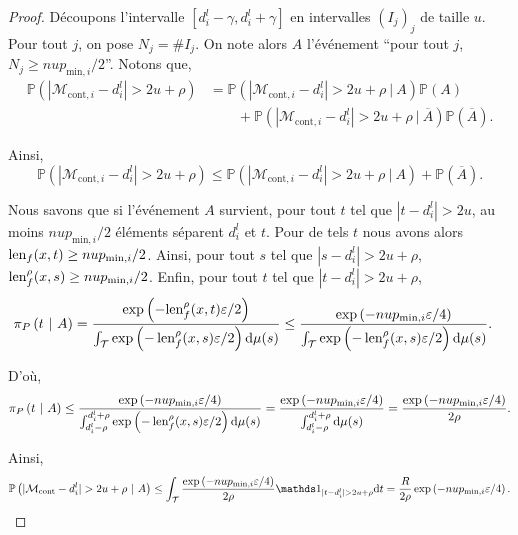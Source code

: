 \begin{proof}
    Découpons l'intervalle \([d_i^l - \gamma, d_i^l + \gamma]\) en intervalles \((I_j)_j\) de taille \(u\). Pour tout \(j\), on pose \(N_j = \#I_j\). On note alors \(A\) l'événement ``pour tout \(j\), \(N_j \geq nup_{\text{min}, i}/2\)''. Notons que,
    \begin{align*}
        \mathbb P\left( |\mathcal  M_{\text{cont}, i} - d_i^l| > 2u + \rho \right) & = \mathbb P\left( |\mathcal M_{\text{cont}, i} - d_i^l| > 2u + \rho \ | \ A \right)\mathbb P\left( A \right)\\
        & \quad \quad  + \mathbb P\left( |\mathcal M_{\text{cont}, i} - d_i^l| > 2u + \rho \ | \ \overline A \right) \mathbb P \left( \overline A  \right).
    \end{align*}

    Ainsi,
    \[
        \mathbb P\left( |\mathcal M_{\text{cont}, i} - d_i^l| > 2u + \rho \right) \leq \mathbb P\left( |\mathcal M_{\text{cont}, i} - d_i^l| > 2u + \rho \ | \ A \right) +  \mathbb P \left( \overline A  \right).
    \]

    Nous savons que si l'événement \(A\) survient, pour tout \(t\) tel que \(|t - d_i^l| > 2u\), au moins \(nup_{\text{min}, i}/2\) éléments séparent \(d_i^l\) et \(t\). Pour de tels \(t\) nous avons alors \(\operatorname{len}_f(x,t) \geq nup_{\text{min}, i}/2\). Ainsi, pour tout \(s\) tel que \(|s - d_i^l| > 2u + \rho\), \(\operatorname{len}_f^\rho(x,s) \geq nup_{\text{min}, i}/2\). Enfin, pour tout \(t\) tel que \(|t - d_i^l| > 2u + \rho\),
    \begin{align*}
        \pi_P\left( t\ |\ A \right) & = \dfrac{\exp\left( -{\operatorname{len}_f^\rho(x,t)\varepsilon}/{2} \right)}{\int_\mathcal T \exp\left( {-\operatorname{len}_f^\rho(x,s)\varepsilon}/{2} \right)\mathrm{d} \mu(s)} \leq \dfrac{\exp\left( -{nup_{\text{min}, i}\varepsilon}/{4} \right)}{\int_\mathcal T \exp\left( {-\operatorname{len}_f^\rho(x,s)\varepsilon}/{2} \right)\mathrm{d} \mu(s)}.
    \end{align*}

    D'où,
    \[
        \pi_P\left( t\ |\ A \right) \leq \dfrac{\exp\left( -{nup_{\text{min}, i}\varepsilon}/{4} \right)}{\int_{d_i^l-\rho}^{d_i^l+\rho} \exp\left( {-\operatorname{len}_f^\rho(x,s)\varepsilon}/{2} \right)\mathrm{d} \mu(s)} = \dfrac{\exp\left( -{nup_{\text{min}, i}\varepsilon}/{4} \right)}{\int_{d_i^l-\rho}^{d_i^l+\rho}\mathrm{d} \mu(s)} = \dfrac{\exp\left( -{nup_{\text{min}, i}\varepsilon}/{4} \right)}{2\rho}.
    \]

    Ainsi,
    \begin{align*}
        \mathbb P\left( |\mathcal  M_{\text{cont}} - d_i^l| > 2u + \rho \ | \ A \right) \leq \int_\mathcal T \dfrac{\exp\left( -{nup_{\text{min}, i}\varepsilon}/{4} \right)}{2\rho}\un_{| t - d_i^l| > 2u + \rho} \dt t = \dfrac{R}{2\rho}\exp\left( -{nup_{\text{min}, i}\varepsilon}/{4} \right).
    \end{align*}



\end{proof}
